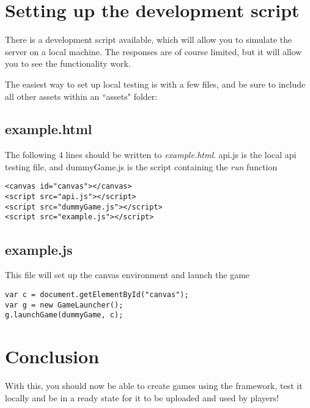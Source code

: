 \documentclass[a4paper,12pt]{article}
\begin{document}
\section{Setting up the development script}

There is a development script available, which will allow you to simulate the server on a local machine. The responses are of course limited, but
it will allow you to see the functionality work.

The easiest way to set up local testing is with a few files, and be sure to include all other assets within an ``assets" folder:

\subsection*{example.html}
The following 4 lines should be written to \textit{example.html}. api.js is the local api testing file, and dummyGame.js is the script containing the \textit{run} function

\begin{verbatim}
<canvas id="canvas"></canvas>
<script src="api.js"></script>
<script src="dummyGame.js"></script>
<script src="example.js"></script>
\end{verbatim}

\subsection*{example.js}
This file will set up the canvas environment and launch the game

\begin{verbatim}
var c = document.getElementById("canvas");
var g = new GameLauncher();
g.launchGame(dummyGame, c);
\end{verbatim}

\section{Conclusion}
With this, you should now be able to create games using the framework, test it locally and be in a ready state for it to be uploaded and used by players!
\end{document}
